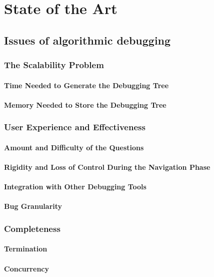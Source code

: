 \chapter{State of the Art}
\label{cap:estadoDeLaCuestion}

\section{Issues of algorithmic debugging}
\subsection{The Scalability Problem}
\subsubsection{Time Needed to Generate the Debugging Tree}
\subsubsection{Memory Needed to Store the Debugging Tree}
\subsection{User Experience and Effectiveness}
\subsubsection{Amount and Difficulty of the Questions}
\subsubsection{Rigidity and Loss of Control During the Navigation Phase}
\subsubsection{Integration with Other Debugging Tools}
\subsubsection{Bug Granularity}
\subsection{Completeness}
\subsubsection{Termination}
\subsubsection{Concurrency}
